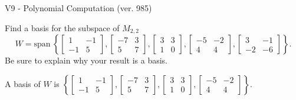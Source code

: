 \begin{exercise}
  \begin{exerciseTitle}V9 - Polynomial Computation (ver. 985)\end{exerciseTitle}
  \begin{exerciseStatement}
    Find a basis for the subspace of \(M_{2,2}\) 
\[W=\mathrm{span}\ \left\{\left[\begin{array}{cc}
1 & -1 \\
-1 & 5
\end{array}\right] , \left[\begin{array}{cc}
-7 & 3 \\
5 & 7
\end{array}\right] , \left[\begin{array}{cc}
3 & 3 \\
1 & 0
\end{array}\right] , \left[\begin{array}{cc}
-5 & -2 \\
4 & 4
\end{array}\right] , \left[\begin{array}{cc}
3 & -1 \\
-2 & -6
\end{array}\right]\right\}.\]
 Be sure to explain why your result is a basis.


  \end{exerciseStatement}
  \begin{exerciseAnswer}
   A basis of \(W\) is  \(\left\{\left[\begin{array}{cc}
1 & -1 \\
-1 & 5
\end{array}\right] , \left[\begin{array}{cc}
-7 & 3 \\
5 & 7
\end{array}\right] , \left[\begin{array}{cc}
3 & 3 \\
1 & 0
\end{array}\right] , \left[\begin{array}{cc}
-5 & -2 \\
4 & 4
\end{array}\right]\right\}\).
  


  \end{exerciseAnswer}
\end{exercise}